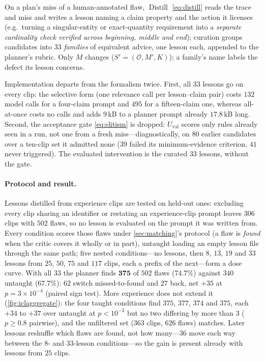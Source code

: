 On a plan's miss of a human-annotated flaw, $\operatorname{Distill}$ \eqref{eq:distill} reads the trace and miss and writes a lesson naming a claim property and the action it licenses (e.g.\ turning a singular-entity or exact-quantity requirement into a \emph{separate cardinality check verified across beginning, middle and end}); curation groups candidates into $33$ \emph{families} of equivalent advice, one lesson each, appended to the planner's rubric. Only $M$ changes ($S' = (\mathcal{O}, M', K)$); a family's name labels the defect its lesson concerns.

Implementation departs from the formalism twice. First, all $33$ lessons go on every clip: the selective form (one relevance call per lesson--claim pair) costs $132$ model calls for a four-claim prompt and $495$ for a fifteen-claim one, whereas all-at-once costs no calls and adds $9$\,kB to a planner prompt already $17.8$\,kB long. Second, the acceptance gate \eqref{eq:elitism} is dropped: $U_{\mathrm{val}}$ scores only rules already seen in a run, not one from a fresh miss---diagnostically, on $80$ earlier candidates over a ten-clip set it admitted none ($39$ failed its minimum-evidence criterion, $41$ never triggered). The evaluated intervention is the curated $33$ lessons, without the gate.

\paragraph{Protocol and result.} Lessons distilled from experience clips are tested on held-out ones: excluding every clip sharing an identifier or restating an experience-clip prompt leaves $306$ clips with $502$ flaws, so no lesson is evaluated on the prompt it was written from. Every condition scores those flaws under \cref{sec:matching}'s protocol (a flaw is \emph{found} when the critic covers it wholly or in part), untaught loading an empty lesson file through the same path; five nested conditions---no lessons, then $8$, $13$, $19$ and $33$ lessons from $25$, $50$, $75$ and $117$ clips, each a prefix of the next---form a dose curve. With all $33$ the planner finds $\mathbf{375}$ of $502$ flaws ($\mathbf{74.7\%}$) against $340$ untaught ($67.7\%$): $62$ switch missed-to-found and $27$ back, net $+35$ at $p = 3\!\times\!10^{-4}$ (paired sign test). More experience does not extend it (\cref{fig:iclaggregate}): the four taught conditions find $375$, $377$, $374$ and $375$, each $+34$ to $+37$ over untaught at $p < 10^{-3}$ but no two differing by more than $3$ ($p \geq 0.8$ pairwise), and the unfiltered set ($363$ clips, $626$ flaws) matches. Later lessons reshuffle which flaws are found, not how many---$36$ move each way between the $8$- and $33$-lesson conditions---so the gain is present already with lessons from $25$ clips.


